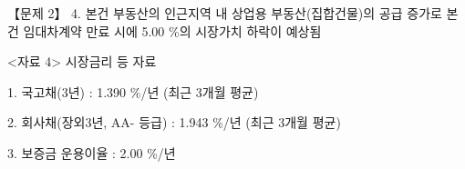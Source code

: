 \begin{longquestion}{【문제 2】}
4. 본건 부동산의 인근지역 내 상업용 부동산(집합건물)의 공급 증가로 본건 임대차계약 만료 시에 5.00 \%의 시장가치 하락이 예상됨 \par
<자료 4> 시장금리 등 자료 \par
1. 국고채(3년) : 1.390 \%/년 (최근 3개월 평균) \par
2. 회사채(장외3년, AA- 등급) : 1.943 \%/년 (최근 3개월 평균) \par
3. 보증금 운용이율 : 2.00 \%/년 \par
\end{longquestion}
